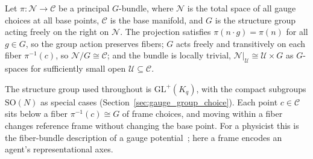\begin{definition}
Let $\pi: \mathcal{N} \to \mathcal{C}$ be a principal $G$-bundle, where $\mathcal{N}$ is the total space of all gauge choices at all base points, $\mathcal{C}$ is the base manifold, and $G$ is the structure group acting freely on the right on $\mathcal{N}$. The projection satisfies $\pi(n \cdot g) = \pi(n)$ for all $g \in G$, so the group action preserves fibers; $G$ acts freely and transitively on each fiber $\pi^{-1}(c)$, so $\mathcal{N}/G \cong \mathcal{C}$; and the bundle is locally trivial, $\mathcal{N}|_{\mathcal{U}} \cong \mathcal{U} \times G$ as $G$-spaces for sufficiently small open $\mathcal{U} \subseteq \mathcal{C}$.
\end{definition}

The structure group used throughout is $\mathrm{GL}^+(K_q)$, with the compact subgroups $\mathrm{SO}(N)$ as special cases (Section~\ref{sec:gauge_group_choice}). Each point $c\in\mathcal{C}$ sits below a fiber $\pi^{-1}(c)\cong G$ of frame choices, and moving within a fiber changes reference frame without changing the base point. For a physicist this is the fiber-bundle description of a gauge potential~\cite{WuYang1975, Nakahara2003}; here a frame encodes an agent's representational axes.

